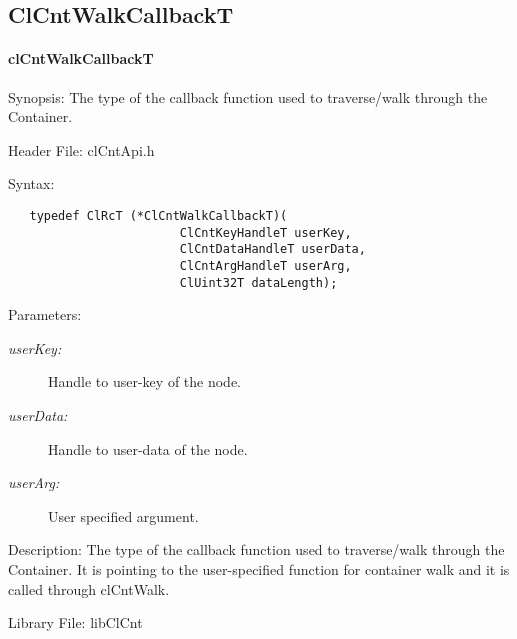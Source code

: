 \subsection{ClCntWalkCallbackT}
\hypertarget{pagecnt119}{}\paragraph{cl\-Cnt\-Walk\-CallbackT}\label{pagecnt119}
\begin{Desc}
\item[Synopsis:]The type of the callback function used to traverse/walk through the Container.
\end{Desc}
\begin{Desc}
\item[Header File:]clCntApi.h\end{Desc}
\begin{Desc}
\item[Syntax:]

\footnotesize\begin{verbatim}   typedef ClRcT (*ClCntWalkCallbackT)(
						ClCntKeyHandleT userKey,
						ClCntDataHandleT userData, 
						ClCntArgHandleT userArg,
						ClUint32T dataLength);
\end{verbatim}
\normalsize
\end{Desc}
\begin{Desc}
\item[Parameters:]
\begin{description}
\item[{\em userKey:}] Handle to user-key of the node.
\item[{\em userData:}] Handle to user-data of the node. 
\item[{\em userArg:}] User specified argument.
\end{description}
\end{Desc}
\begin{Desc}
\item[Description:]
The type of the callback function used to traverse/walk through the Container. It is pointing to the user-specified function for container walk and it
is called through clCntWalk.\end{Desc}
\begin{Desc}
\item[Library File:]lib\-Cl\-Cnt\end{Desc}




